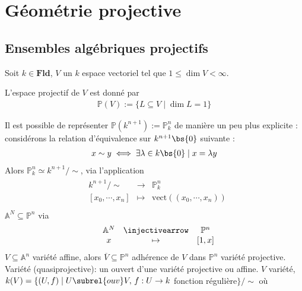 \chapter{Géométrie projective}
    \section{Ensembles algébriques projectifs}
        Soit $k \in \mathbf{Fld}$, $V$ un $k$ espace vectoriel tel que $1 \leq \dim V < \infty$.
        \begin{defi}
            L'espace projectif de $V$ est donné par
            \begin{align}
                \mathbb{P}(V) := \{L \subseteq V \mid \dim L = 1\}
            \end{align}
        \end{defi}
        Il est possible de représenter $\mathbb{P}(k^{n+1}) := \mathbb{P}^n_k$ de manière un peu plus explicite : considérons la relation d'équivalence sur $k^{n+1} \bs \{0\}$ suivante : 
        \begin{align*}
            x \sim y \iff \exists \lambda \in k \bs \{0\} \mid x = \lambda y
        \end{align*}
        Alors $\mathbb{P}^n_k \simeq k^{n+1}/\sim$, via l'application
        \begin{align*}
            \begin{array}{cccc}
                & k^{n+1}/\sim & \to & \mathbb{P}^n_k \\
                & [x_0, \cdots, x_n] & \mapsto & \mathrm{vect}((x_0, \cdots, x_n))\\
            \end{array}
        \end{align*}
        $\mathbb{A}^N \subseteq \mathbb{P}^n$ via 
        \begin{align*}
            \begin{array}{cccc}
                & \mathbb{A}^N & \injectivearrow & \mathbb{P}^n \\
                & x & \mapsto & [1, x] \\
            \end{array}
        \end{align*}
        $V \subseteq \mathbb{A}^n$ variété affine, alors $\overline{V} \subseteq \mathbb{P}^n$ adhérence de $V$ dans $\mathbb{P}^n$ variété projective. Variété (quasiprojective): un ouvert d'une variété projective ou affine. $V$ variété, $k(V) = \{(U,f) \mid U \subrel{ouv} V,\, f : U \to k$ fonction régulière$\}/\sim$ où
